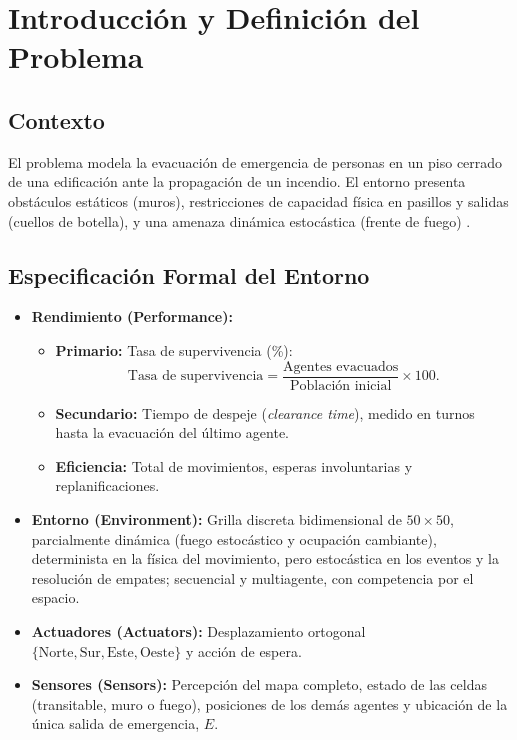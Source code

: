\documentclass[11pt,letterpaper]{article}
\begin{document}
\pagestyle{plain}
\tableofcontents


\clearpage
{}
\pagestyle{fancy}

\newpage

\section{Introducción y Definición del Problema}
\subsection{Contexto}
El problema modela la evacuación de emergencia de personas en un piso cerrado de una edificación ante la propagación de un incendio. El entorno presenta obstáculos estáticos (muros), restricciones de capacidad física en pasillos y salidas (cuellos de botella), y una amenaza dinámica estocástica (frente de fuego) \cite{helbing2000}.

\subsection{Especificación Formal del Entorno}
\begin{itemize}
    \item \textbf{Rendimiento (Performance):}
    \begin{itemize}
        \item \textbf{Primario:} Tasa de supervivencia (\%):
        \[
        \text{Tasa de supervivencia}
        = \frac{\text{Agentes evacuados}}{\text{Población inicial}} \times 100.
        \]
        \item \textbf{Secundario:} Tiempo de despeje (\textit{clearance time}), medido en turnos hasta la evacuación del último agente.
        \item \textbf{Eficiencia:} Total de movimientos, esperas involuntarias y replanificaciones.
    \end{itemize}

    \item \textbf{Entorno (Environment):} Grilla discreta bidimensional de $50 \times 50$, parcialmente dinámica (fuego estocástico y ocupación cambiante), determinista en la física del movimiento, pero estocástica en los eventos y la resolución de empates; secuencial y multiagente, con competencia por el espacio.

    \item \textbf{Actuadores (Actuators):} Desplazamiento ortogonal $\{\text{Norte},\text{Sur},\text{Este},\text{Oeste}\}$ y acción de espera.

    \item \textbf{Sensores (Sensors):} Percepción del mapa completo, estado de las celdas (transitable, muro o fuego), posiciones de los demás agentes y ubicación de la única salida de emergencia, $E$.
\end{itemize}
\end{document}
